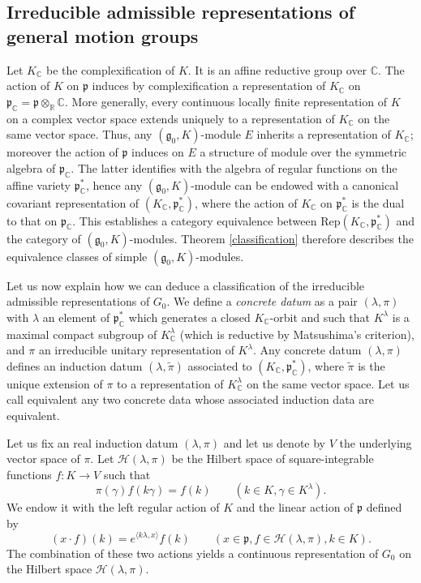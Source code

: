 \documentclass{amsart}
\theoremstyle{definition}
\begin{document}
\subsection{Irreducible admissible representations of general motion groups} Let $K_\mathbb{C}$ be the complexification of $K$. It is an affine reductive group over $\mathbb{C}$. The action of $K$ on $\mathfrak{p}$ induces by complexification a representation of $K_\mathbb{C}$ on $\mathfrak{p}_\mathbb{C} = \mathfrak{p}\otimes_\mathbb{R}\mathbb{C}$. More generally, every continuous locally finite representation of $K$ on a complex vector space extends uniquely to a representation of $K_\mathbb{C}$ on the same vector space. Thus, any $(\mathfrak{g}_0,K)$-module $E$ inherits a representation of $K_\mathbb{C}$; moreover the action of $\mathfrak{p}$ induces on $E$ a structure of module over the symmetric algebra of $\mathfrak{p}_\mathbb{C}$. The latter identifies with the algebra of regular functions on the affine variety $\mathfrak{p}_\mathbb{C}^*$, hence any $(\mathfrak{g}_0,K)$-module can be endowed with a canonical covariant representation of $(K_\mathbb{C}, \mathfrak{p}^*_\mathbb{C})$, where the action of $K_\mathbb{C}$ on $\mathfrak{p}^*_\mathbb{C}$ is the dual to that on $\mathfrak{p}_\mathbb{C}$. This establishes a category equivalence between $\mathrm{Rep}(K_\mathbb{C}, \mathfrak{p}^*_\mathbb{C})$ and the category of $(\mathfrak{g}_0,K)$-modules. Theorem \ref{classification} therefore describes the equivalence classes of simple $(\mathfrak{g}_0,K)$-modules.

Let us now explain how we can deduce a classification of the irreducible admissible representations of $G_0$. We define a \textit{concrete datum} as a pair $(\lambda, \pi)$ with $\lambda$ an element of $\mathfrak{p}^*_\mathbb{C}$ which generates a closed $K_\mathbb{C}$-orbit and such that $K^\lambda$ is a maximal compact subgroup of $K_\mathbb{C}^\lambda$ (which is reductive by Matsushima's criterion), and $\pi$ an irreducible unitary representation of $K^\lambda$. Any concrete datum $(\lambda, \pi)$ defines an induction datum $(\lambda, \tilde{\pi})$ associated to $(K_\mathbb{C}, \mathfrak{p}^*_\mathbb{C})$, where $\tilde \pi$ is the unique extension of $\pi$ to a representation of $K_\mathbb{C}^\lambda$ on the same vector space. Let us call equivalent any two concrete data whose associated induction data are equivalent. 

Let us fix an real induction datum $(\lambda, \pi)$ and let us denote by $V$ the underlying vector space of $\pi$. Let $\mathcal{H}(\lambda,\pi)$ be the Hilbert space of square-integrable functions $f : K \to V$ such that
$$\pi(\gamma) f(k \gamma) = f(k) \qquad (k \in K, \gamma \in K^\lambda).$$
We endow it with the left regular action of $K$ and the linear action of $\mathfrak{p}$ defined by
$$(x \cdot f)(k) = e^{\langle k\lambda, x\rangle}f(k) \qquad (x \in \mathfrak{p}, f \in \mathcal{H}(\lambda,\pi), k \in K).$$
The combination of these two actions yields a continuous representation of $G_0$ on the Hilbert space $\mathcal{H}(\lambda,\pi)$.
\end{document}
